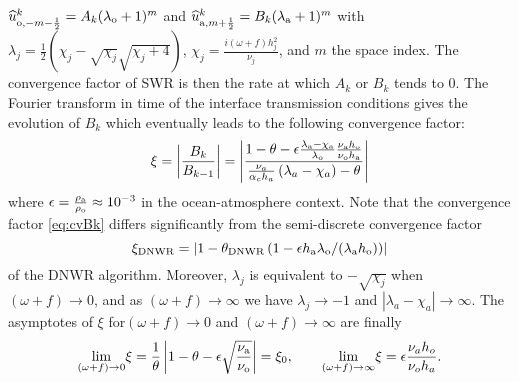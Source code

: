 $\widehat{u}_{{\rm o}, -m - \frac{1}{2}}^k = A_k (\lambda_{\rm o}+1)^m$
and
$\widehat{u}_{{\rm a}, m + \frac{1}{2}}^k = B_k (\lambda_{\rm a}+1)^m$ 
with $\lambda_j = \frac{1}{2}\left(\chi_j - \sqrt{\chi_j} \sqrt{\chi_j + 4}\right)$,
$\chi_j=\frac{i (\omega+f) h_j^2}{\nu_j}$,
and $m$ the space index. The convergence factor of SWR is then
the rate at which $A_k$ or $B_k$ tends to 0.
The Fourier transform in time of the interface
transmission conditions gives
the evolution of $B_k$ which eventually leads to 
the following convergence factor: 
\begin{equation} \label{eq:cvBk}
\xi = \left|\frac{B_k}{B_{k-1}}\right| = 
\left|
	\frac{1 - \theta - \epsilon \frac{\lambda_{\rm a} - \chi_{\rm a}}
		{\lambda_{\rm o}} \frac{\nu_{\rm a} h_{\rm o}}
			{\nu_{\rm o} h_{\rm a}}}
	{\frac{\nu_a}{\alpha_c h_a}
	\left(\lambda_a - \chi_a \right)
	- \theta}
\right|
\end{equation}
where $\epsilon = \frac{\rho_{\rm a}}{\rho_{\rm o}} \approx 10^{-3}$
in the ocean-atmosphere  context.
Note that the convergence factor \eqref{eq:cvBk} differs significantly from the semi-discrete convergence factor 
\begin{equation}
\xi_{\rm DNWR} = \left|1 - \theta_{\rm DNWR} \left(
1 - \epsilon h_{\rm a} \lambda_{\rm o} / (\lambda_{\rm a}h_{\rm o})\right) \right|
\end{equation}
 of the DNWR algorithm.
Moreover, $\lambda_j$ is equivalent to $-\sqrt{\chi_j}$ when
$(\omega+f) \rightarrow 0$, and
as $(\omega+f) \rightarrow \infty$ we have
$\lambda_j\rightarrow -1$ and
$|\lambda_a - \chi_a| \rightarrow \infty$. The asymptotes
of $\xi$ for$(\omega+f) \rightarrow 0$ and
$(\omega+f) \rightarrow \infty$ are finally
\[
 \underset{(\omega+f) \rightarrow 0}{\mathrm{lim}} \xi = \frac{1}{\theta} \left| 1-\theta-\epsilon \sqrt{\frac{\nu_{\rm a}}{\nu_{\rm o}}}  \right| = \xi_0, \qquad
 \underset{(\omega+f) \rightarrow \infty}{\mathrm{lim}} \xi =
 \epsilon \frac{\nu_a h_o}{\nu_o h_a}.
\]
